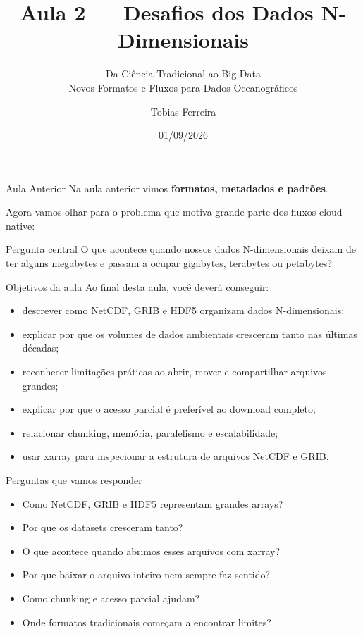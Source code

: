 \documentclass[aspectratio=169]{beamer}
\title[Desafios dos Dados N-Dimensionais]{Aula 2 --- Desafios dos Dados N-Dimensionais}
\subtitle{Da Ciência Tradicional ao Big Data\\
Novos Formatos e Fluxos para Dados Oceanográficos}
\author{Tobias Ferreira}
\institute{Instituto Nacional de Pesquisas Oceânicas (INPO)}
\date{01/09/2026}
\begin{document}
\begin{frame}
  \titlepage
\end{frame}

\begin{frame}{Aula Anterior}
\Large
Na aula anterior vimos \textbf{formatos, metadados e padrões}.

\vspace{0.4cm}

Agora vamos olhar para o problema que motiva grande parte dos fluxos cloud-native:

\vspace{0.4cm}

\begin{block}{Pergunta central}
O que acontece quando nossos dados N-dimensionais deixam de ter alguns megabytes e passam a ocupar gigabytes, terabytes ou petabytes?
\end{block}
\end{frame}

\begin{frame}{Objetivos da aula}
Ao final desta aula, você deverá conseguir:

\begin{itemize}
  \item descrever como NetCDF, GRIB e HDF5 organizam dados N-dimensionais;
  \item explicar por que os volumes de dados ambientais cresceram tanto nas últimas décadas;
  \item reconhecer limitações práticas ao abrir, mover e compartilhar arquivos grandes;
  \item explicar por que o acesso parcial é preferível ao download completo;
  \item relacionar chunking, memória, paralelismo e escalabilidade;
  \item usar xarray para inspecionar a estrutura de arquivos NetCDF e GRIB.
\end{itemize}
\end{frame}

\begin{frame}{Perguntas que vamos responder}
\Large
\begin{itemize}
  \item Como NetCDF, GRIB e HDF5 representam grandes arrays?
  \item Por que os datasets cresceram tanto?
  \item O que acontece quando abrimos esses arquivos com xarray?
  \item Por que baixar o arquivo inteiro nem sempre faz sentido?
  \item Como chunking e acesso parcial ajudam?
  \item Onde formatos tradicionais começam a encontrar limites?
\end{itemize}
\end{frame}
\end{document}
